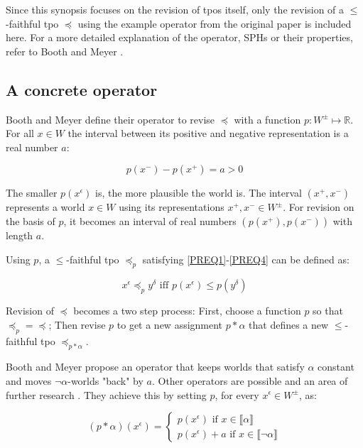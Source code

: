 \documentclass[english, 12pt]{scrartcl}
\theoremstyle{definition}
\theoremstyle{definition}
\theoremstyle{definition}
\newcommand{\modelsOf}[1]{\llbracket #1 \rrbracket}
\begin{document}
Since this synopsis focuses on the revision of tpos itself, only the revision of a $\leq$-faithful tpo $\preceq$ using the example operator from the original paper is included here. For a more detailed explanation of the operator, SPHs or their properties, refer to Booth and Meyer \cite{Booth2011}.

\subsection{A concrete operator}
Booth and Meyer define their operator to revise $\preceq$ with a function $p: W^{\pm} \mapsto \mathds{R}$. For all $x \in W$ the interval between its positive and negative representation is a real number $a$:

\begin{equation*}
    p(x^{-}) - p(x^{+}) = a > 0
\end{equation*}

The smaller $p(x^{\epsilon})$ is, the more plausible the world is. The interval $(x^{+}, x^{-})$ represents a world $x \in W$ using its representations $x^{+}, x^{-} \in W^{\pm}$. For revision on the basis of $p$, it becomes an interval of real numbers $(p(x^{+}), p(x^{-}))$ with length $a$.

\bigskip

Using $p$, a $\leq$-faithful tpo $\preceq_{p}$ satisfying \ref{PREQ1}-\ref{PREQ4} can be defined as:

\begin{equation*}
    x^{\epsilon} \preceq_{p} y^{\delta} \textrm{ iff } p(x^{\epsilon}) \leq p(y^{\delta} )
\end{equation*}

\bigskip

Revision of $\preceq$ becomes a two step process: First, choose a function $p$ so that $\preceq_{p} = \preceq$; Then revise $p$ to get a new assignment $p \ast \alpha$ that defines a new $\leq$-faithful tpo $\preceq_{p \ast \alpha}$.

Booth and Meyer propose an operator that keeps worlds that satisfy $\alpha$ constant and moves $\neg\alpha$-worlds "back" by $a$. Other operators are possible and an area of further research \cite{Booth2011}. They achieve this by setting $p$, for every $x^{\epsilon} \in W^{\pm}$, as:
    
\begin{equation*}
    (p \ast \alpha)(x^{\epsilon}) = \left\{
                    \begin{array}{ll}
                      p(x^{\epsilon}) \textrm{ if } x \in \modelsOf{\alpha}\\
                      p(x^{\epsilon}) + a \textrm{ if } x \in \modelsOf{\neg\alpha}
                    \end{array}
                  \right.
\end{equation*}
\end{document}
